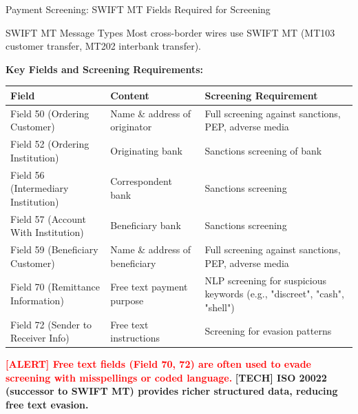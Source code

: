 \documentclass[11pt,a4paper]{beamer}
\newcommand{\redflag}[1]{\textcolor{red}{\textbf{[ALERT] #1}}}
\newcommand{\techterm}[1]{\textcolor{cyan!50!black}{\textbf{[TECH] #1}}}
\begin{document}
\begin{frame}{Payment Screening: SWIFT MT Fields Required for Screening}
	\begin{block}{SWIFT MT Message Types}
		Most cross-border wires use SWIFT MT (MT103 customer transfer, MT202 interbank transfer).
	\end{block}
	\textbf{Key Fields and Screening Requirements:}
	\begin{longtable}{p{}|p{}|p{}}
		\hline
		\rowcolor{lightgray}
		\textbf{Field} & \textbf{Content} & \textbf{Screening Requirement} \\
		\hline
		Field 50 (Ordering Customer) & Name \& address of originator & Full screening against sanctions, PEP, adverse media \\
		\hline
		Field 52 (Ordering Institution) & Originating bank & Sanctions screening of bank \\
		\hline
		Field 56 (Intermediary Institution) & Correspondent bank & Sanctions screening \\
		\hline
		Field 57 (Account With Institution) & Beneficiary bank & Sanctions screening \\
		\hline
		Field 59 (Beneficiary Customer) & Name \& address of beneficiary & Full screening against sanctions, PEP, adverse media \\
		\hline
		Field 70 (Remittance Information) & Free text payment purpose & NLP screening for suspicious keywords (e.g., "discreet", "cash", "shell") \\
		\hline
		Field 72 (Sender to Receiver Info) & Free text instructions & Screening for evasion patterns \\
		\hline
	\end{longtable}
	\redflag{Free text fields (Field 70, 72) are often used to evade screening with misspellings or coded language.}
	\techterm{ISO 20022 (successor to SWIFT MT) provides richer structured data, reducing free text evasion.}
\end{frame}
\end{document}
